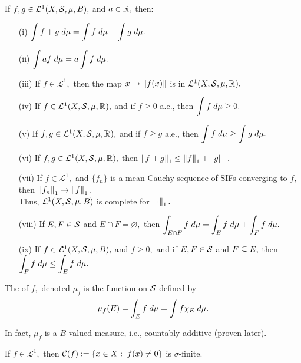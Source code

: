 \begin{prop}
If $f,g\in\mathcal{L}^1(X,\mathcal{S},\mu, B),$ and $a\in\mathbb{R}^{},$ then:
\begin{enumerate}
\item[(i)] $\displaystyle\int f+g\;d\mu=\displaystyle\int f\;d\mu+\displaystyle\int g\;d\mu.$
\item[(ii)] $\displaystyle\int af\;d\mu=a\displaystyle\int f\;d\mu.$
\item[(iii)] If $f\in\mathcal{L}^1,$ then the map $x\mapsto\left\lVert f(x)\right\rVert$ is in $\mathcal{L}^1(X,\mathcal{S},\mu,\mathbb{R}^{}).$
\item[(iv)] If $f\in\mathcal{L}^1(X,\mathcal{S},\mu,\mathbb{R}^{}),$ and if $f\geq 0$ a.e., then $\displaystyle\int f\;d\mu\geq 0.$
\item[(v)] If $f,g\in\mathcal{L}^1(X,\mathcal{S},\mu,\mathbb{R}^{}),$ and if $f\geq g$ a.e., then $\displaystyle\int f\;d\mu\geq\displaystyle\int g\;d\mu.$
\item[(vi)] If $f,g\in\mathcal{L}^1(X,\mathcal{S},\mu,\mathbb{R}^{}),$ then $\left\lVert f+g\right\rVert_1\leq\left\lVert f\right\rVert_1+\left\lVert g\right\rVert_1.$
\item[(vii)] If $f\in\mathcal{L}^1,$ and $\{f_n\}$ is a mean Cauchy sequence of SIFs converging to $f,$ then $\left\lVert f_n\right\rVert_1\rightarrow\left\lVert f\right\rVert_1.$ \\
Thus, $\mathcal{L}^1(X,\mathcal{S},\mu,B)$ is complete for $\left\lVert\cdot\right\rVert_1.$
\item[(viii)] If $E,F\in\mathcal{S}$ and $E\cap F=\varnothing,$ then $\displaystyle\int_{E\cap F} f\;d\mu=\displaystyle\int_E f\;d\mu+\displaystyle\int_F f\;d\mu.$
\item[(ix)] If $f\in\mathcal{L}^1(X,\mathcal{S},\mu,B),$ and $f\geq 0,$ and if $E,F\in\mathcal{S}$ and $F\subseteq E,$ then $\displaystyle\int_F f\;d\mu\leq\displaystyle\int_E f\;d\mu.$
\end{enumerate}
\end{prop}

\begin{defn}
The  of $f,$ denoted $\mu_f$ is the function on $\mathcal{S}$ defined by
$$\mu_f(E)=\displaystyle\int_E f\;d\mu=\displaystyle\int f\chi_E\;d\mu.$$
\end{defn}

\noindent In fact, $\mu_f$ is a $B$-valued measure, i.e., countably additive (proven later).

\begin{prop}
If $f\in\mathcal{L}^1,$ then $\mathcal{C}(f):=\{x\in X:\;f(x)\neq 0\}$ is $\sigma$-finite. \\ \\
\end{prop}

